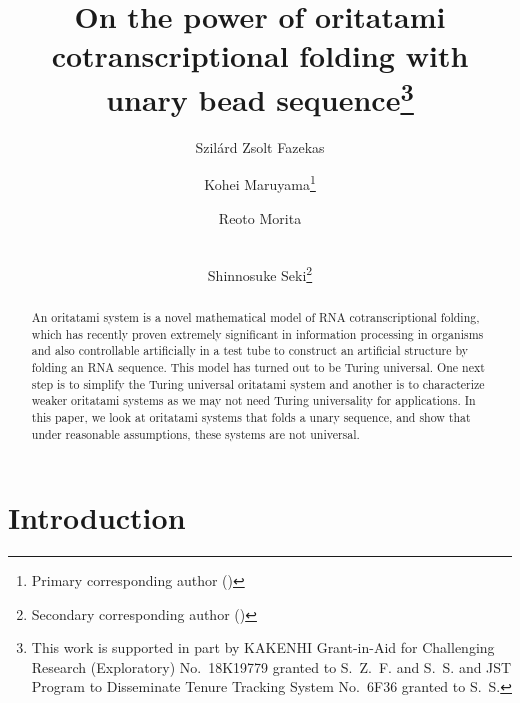 \documentclass[runningheads]{llncs}
\title{On the power of oritatami cotranscriptional folding with unary bead sequence\thanks{This work is supported in part by KAKENHI Grant-in-Aid for Challenging Research (Exploratory) No.~18K19779 granted to S.~Z.~F. and S.~S. and JST Program to Disseminate Tenure Tracking System No.~6F36 granted to S.~S.}
}
\author{
Szil\'{a}rd Zsolt Fazekas\inst{1} \and 
Kohei Maruyama\inst{2}\thanks{Primary corresponding author (\email{k.maruyama@uec.ac.jp})} \and
Reoto Morita\inst{2} \and \\
Shinnosuke Seki\inst{2}\thanks{Secondary corresponding author (\email{s.seki@uec.ac.jp})}
}
\institute{
Akita University, 
Graduate School of Engineering Science, 
1-1 Tegate Gakuen-machi, Akita, 0108502, Japan \\
\and
The University of Electro-Communications, 
1-5-1 Chofugaoka, Chofu, Tokyo, 1828585, Japan \\
}
\begin{document}
\maketitle

\begin{abstract}
An oritatami system is a novel mathematical model of RNA cotranscriptional folding, which has recently proven extremely significant in information processing in organisms and also controllable artificially in a test tube to construct an artificial structure by folding an RNA sequence.  
This model has turned out to be Turing universal. 
One next step is to simplify the Turing universal oritatami system and another is to characterize weaker oritatami systems as we may not need Turing universality for applications. 
In this paper, we look at oritatami systems that folds a unary sequence, and show that under reasonable assumptions, these systems are not universal.
\end{abstract}

	\section{Introduction}
\end{document}
